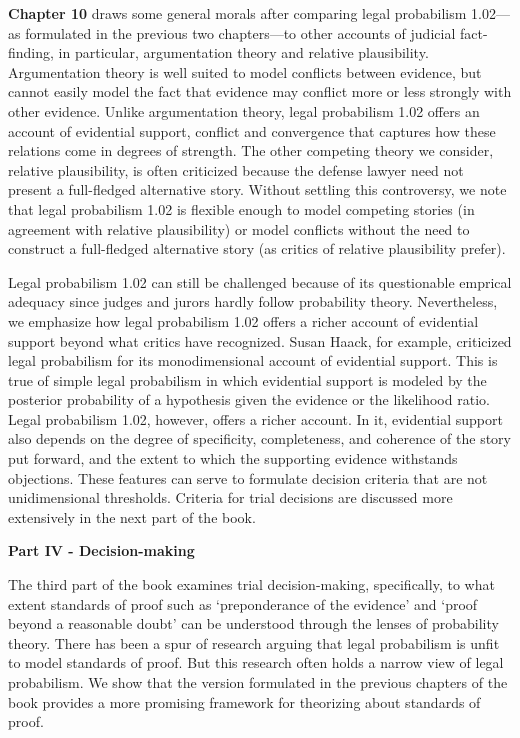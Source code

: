 \documentclass[
  10pt,
  dvipsnames,enabledeprecatedfontcommands]{scrartcl}
\begin{document}
\textbf{Chapter 10} draws some general morals after comparing legal
probabilism 1.02---as formulated in the previous two chapters---to other
accounts of judicial fact-finding, in particular, argumentation theory
and relative plausibility. Argumentation theory is well suited to model
conflicts between evidence, but cannot easily model the fact that
evidence may conflict more or less strongly with other evidence. Unlike
argumentation theory, legal probabilism 1.02 offers an account of
evidential support, conflict and convergence that captures how these
relations come in degrees of strength. The other competing theory we
consider, relative plausibility, is often criticized because the defense
lawyer need not present a full-fledged alternative story. Without
settling this controversy, we note that legal probabilism 1.02 is
flexible enough to model competing stories (in agreement with relative
plausibility) or model conflicts without the need to construct a
full-fledged alternative story (as critics of relative plausibility
prefer).

Legal probabilism 1.02 can still be challenged because of its
questionable emprical adequacy since judges and jurors hardly follow
probability theory. Nevertheless, we emphasize how legal probabilism
1.02 offers a richer account of evidential support beyond what critics
have recognized. Susan Haack, for example, criticized legal probabilism
for its monodimensional account of evidential support. This is true of
simple legal probabilism in which evidential support is modeled by the
posterior probability of a hypothesis given the evidence or the
likelihood ratio. Legal probabilism 1.02, however, offers a richer
account. In it, evidential support also depends on the degree of
specificity, completeness, and coherence of the story put forward, and
the extent to which the supporting evidence withstands objections. These
features can serve to formulate decision criteria that are not
unidimensional thresholds. Criteria for trial decisions are discussed
more extensively in the next part of the book.

\vspace{3mm}

\noindent \textbf{Part IV - Decision-making}

\noindent The third part of the book examines trial decision-making,
specifically, to what extent standards of proof such as `preponderance
of the evidence' and `proof beyond a reasonable doubt' can be understood
through the lenses of probability theory. There has been a spur of
research arguing that legal probabilism is unfit to model standards of
proof. But this research often holds a narrow view of legal probabilism.
We show that the version formulated in the previous chapters of the book
provides a more promising framework for theorizing about standards of
proof.
\end{document}
